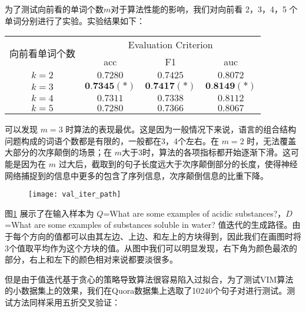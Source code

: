 为了测试向前看的单词个数$m$对于算法性能的影响，我们对向前看 2，3，4，5 个单词分别进行了实验。实验结果如下：

\begin{table}[!htbp]
    \label{tab:MDP_forwrd_word}
    \centering
    \footnotesize%
    \setlength{\tabcolsep}{4pt}%
    \renewcommand{\arraystretch}{1.2}%
    \begin{tabular}{cccc}
        \hline
        \multirow{2}{*}{向前看单词个数} &
        \multicolumn{3}{c}{\multirow{1}{*}{Evaluation Criterion}} \\
        \cline{2-4} & acc & F1 & auc \\
        \hline
        $k=2$ & $0.7280$ & $0.7425$ & $0.8072$ \\
        $k=3$ & $\textbf{0.7345}(*)$ & $\textbf{0.7417}(*)$ & $\textbf{0.8149}(*)$ \\
        $k=4$ & $0.7311$ & $0.7338$ & $0.8112$\\
        $k=5$ & $0.7280$ & $0.7366$ & $0.8067$\\
        \hline
    \end{tabular}
\end{table}

可以发现 $m=3$ 时算法的表现最优。这是因为一般情况下来说，语言的组合结构问题构成的词语个数都是有限的，一般都在3，4个左右。在 $m=2$ 时，无法覆盖大部分的次序颠倒的场景；在 $m$大于3时，算法的各项指标都开始逐渐下滑。这可能是因为在 $m$ 过大后，截取到的句子长度远大于次序颠倒部分的长度，使得神经网络捕捉到的信息中更多的包含了序列信息，次序颠倒信息的比重下降。

\begin{figure}[H]
    \centering
    \texttt{[image: val\_iter\_path]}
    \label{fig:val_iter_path}
\end{figure}

图\ref{fig:val_iter_path} 展示了在输入样本为 $Q$=What are some examples of acidic substances?，$D$=What are some examples of substances soluble in water? 值迭代的生成路径。由于每个方向的值都可以由其左边、上边、和左上的方块得到，因此我们在画图时将3个值取平均作为这个方块的值。从图中我们可以明显发现，右下角为颜色最浓的部分，右上和左下的颜色相对来说都要淡很多。

但是由于值迭代基于贪心的策略导致算法很容易陷入过拟合，为了测试VIM算法的小数据集上的效果，我们在Quora数据集上选取了10240个句子对进行测试。测试方法同样采用五折交叉验证：

